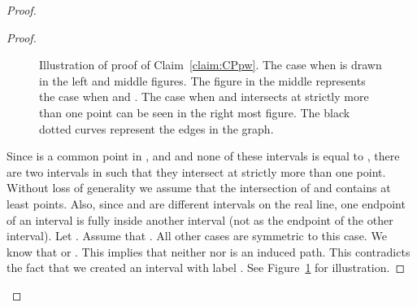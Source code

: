 \begin{proof}
\begin{proof}
\begin{figure}
\begin{subfigure}[b]{0.5\textwidth}
\end{subfigure}
\begin{subfigure}[b]{0.5\textwidth}
        \centering

\end{subfigure}
\caption{Illustration of 
proof of Claim~\ref{claim:CPpw}. The case when  is drawn in the left and middle figures. 
The figure in the middle represents the 
case when  and .
The case when  and  intersects at strictly more than one point can be seen in the  right most figure.  
The black dotted curves represent the edges in the graph. }
\label{figure_pointinterval}
\end{figure}







Since  is a common point in ,  and  and none of these intervals is equal to , there are two intervals in 
 such that they intersect at strictly more than one point. 
Without loss of generality we assume that the intersection of   and 
contains at least  points. Also, since  and  are different intervals 
on the real line, one endpoint of an interval is fully inside another interval (not as the endpoint of the other interval). Let . 
Assume that . All other cases are symmetric to this case.  
We know that   or .
This implies that 
neither  nor  is an induced path. This contradicts the fact that we created an interval 
 with label . See Figure~\ref{figure_pointinterval} for illustration.  



\end{proof}
\end{proof}
